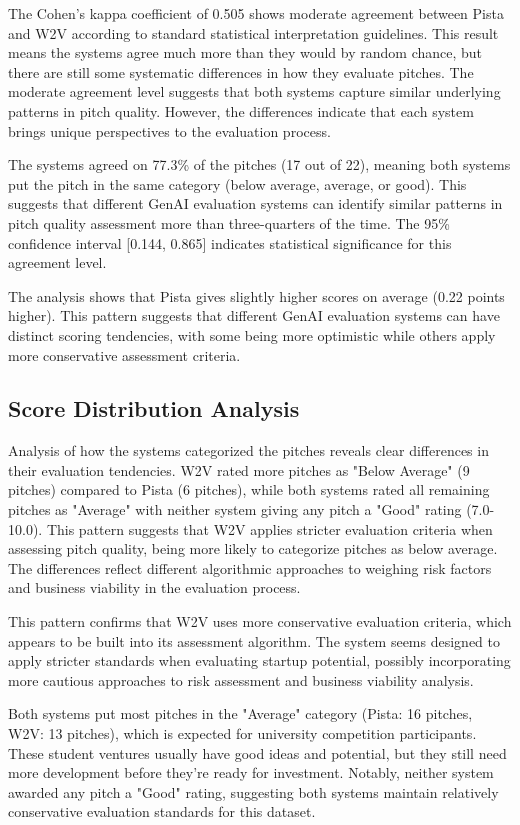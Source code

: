 The Cohen's kappa coefficient of 0.505 shows moderate agreement between Pista and W2V according to standard statistical interpretation guidelines. This result means the systems agree much more than they would by random chance, but there are still some systematic differences in how they evaluate pitches. The moderate agreement level suggests that both systems capture similar underlying patterns in pitch quality. However, the differences indicate that each system brings unique perspectives to the evaluation process.

The systems agreed on 77.3\% of the pitches (17 out of 22), meaning both systems put the pitch in the same category (below average, average, or good). This suggests that different GenAI evaluation systems can identify similar patterns in pitch quality assessment more than three-quarters of the time. The 95\% confidence interval [0.144, 0.865] indicates statistical significance for this agreement level.

The analysis shows that Pista gives slightly higher scores on average (0.22 points higher). This pattern suggests that different GenAI evaluation systems can have distinct scoring tendencies, with some being more optimistic while others apply more conservative assessment criteria.

\subsection{Score Distribution Analysis}

Analysis of how the systems categorized the pitches reveals clear differences in their evaluation tendencies. W2V rated more pitches as "Below Average" (9 pitches) compared to Pista (6 pitches), while both systems rated all remaining pitches as "Average" with neither system giving any pitch a "Good" rating (7.0-10.0). This pattern suggests that W2V applies stricter evaluation criteria when assessing pitch quality, being more likely to categorize pitches as below average. The differences reflect different algorithmic approaches to weighing risk factors and business viability in the evaluation process.

This pattern confirms that W2V uses more conservative evaluation criteria, which appears to be built into its assessment algorithm. The system seems designed to apply stricter standards when evaluating startup potential, possibly incorporating more cautious approaches to risk assessment and business viability analysis.

Both systems put most pitches in the "Average" category (Pista: 16 pitches, W2V: 13 pitches), which is expected for university competition participants. These student ventures usually have good ideas and potential, but they still need more development before they're ready for investment. Notably, neither system awarded any pitch a "Good" rating, suggesting both systems maintain relatively conservative evaluation standards for this dataset.

